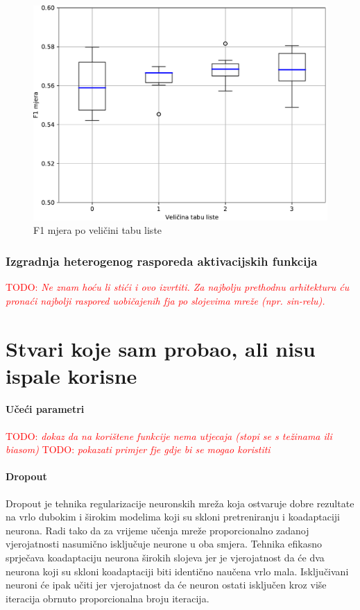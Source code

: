 \documentclass[times, utf8, numeric, diplomski]{fer}
\def\TODO#1{\noindent\textcolor{red}{TODO: \textit{#1}}\newline}
\def\todo#1{\TODO{#1}}
\begin{document}
\begin{figure}[H]
\includegraphics[width=\textwidth]{GP_256class_f1.pdf}
\centering
\caption{F1 mjera po veličini tabu liste}
\label{fig:gp_256_f1}
\end{figure}

\subsection{Izgradnja heterogenog rasporeda aktivacijskih funkcija}
\todo{Ne znam hoću li stići i ovo izvrtiti. Za najbolju prethodnu arhitekturu ću pronaći najbolji raspored uobičajenih fja po slojevima mreže (npr. sin-relu).}

\chapter{Stvari koje sam probao, ali nisu ispale korisne}
\subsubsection{Učeći parametri}
\todo{dokaz da na korištene funkcije nema utjecaja (stopi se s težinama ili biasom)}
\todo{pokazati primjer fje gdje bi se mogao koristiti}

\subsubsection{Dropout}
Dropout \citep{dropout} je tehnika regularizacije neuronskih mreža koja ostvaruje dobre rezultate na vrlo dubokim i širokim modelima koji su skloni pretreniranju i koadaptaciji neurona. Radi tako da za vrijeme učenja mreže proporcionalno zadanoj vjerojatnosti nasumično isključuje neurone u oba smjera. Tehnika efikasno sprječava koadaptaciju neurona širokih slojeva jer je vjerojatnost da će dva neurona koji su skloni koadaptaciji biti identično naučena vrlo mala. Isključivani neuroni će ipak učiti jer vjerojatnost da će neuron ostati isključen kroz više iteracija obrnuto proporcionalna broju iteracija.
\end{document}
